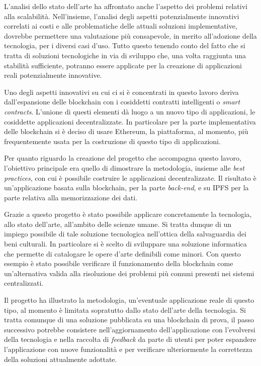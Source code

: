 L'analisi dello stato dell'arte ha affrontato anche l'aspetto dei problemi relativi alla scalabilità. Nell'insieme, l'analisi degli aspetti potenzialmente innovativi correlati ai costi e alle problematiche delle attuali soluzioni implementative, dovrebbe permettere una valutazione più consapevole, in merito all'adozione della tecnologia, per i diversi casi d'uso. Tutto questo tenendo conto del fatto che si tratta di soluzioni tecnologiche in via di sviluppo che, una volta raggiunta una stabilità sufficiente, potranno essere applicate per la creazione di applicazioni reali potenzialmente innovative. 

Uno degli aspetti innovativi su cui ci si è concentrati in questo lavoro deriva dall'espansione delle blockchain con i cosiddetti contratti intelligenti o \emph{smart contracts}. L'unione di questi elementi dà luogo a un nuovo tipo di applicazioni, le cosiddette applicazioni decentralizzate. In particolare per la parte implementativa delle blockchain si è deciso di usare Ethereum, la piattaforma, al momento, più frequentemente usata per la costruzione di questo tipo di applicazioni.

Per quanto riguardo la creazione del progetto che accompagna questo lavoro, l’obiettivo principale era quello di dimostrare la metodologia, insieme alle \emph{best practices}, con cui è possibile costruire le applicazioni decentralizzate. Il risultato è un'applicazione basata sulla blockchain, per la parte \emph{back-end}, e su IPFS per la parte relativa alla memorizzazione dei dati. 

Grazie a questo progetto è stato possibile applicare concretamente la tecnologia, allo stato dell'arte, all'ambito delle scienze umane. Si tratta dunque di un impiego possibile di tale soluzione tecnologica nell'ottica della salvaguardia dei beni culturali. In particolare si è scelto di sviluppare una soluzione informatica che permette di catalogare le opere d'arte definibili come minori. Con questo esempio è stato possibile verificare il funzionamento della blockchain come un’alternativa valida alla risoluzione dei problemi più comuni presenti nei sistemi centralizzati. 

Il progetto ha illustrato la metodologia, un'eventuale applicazione reale di questo tipo, al momento è limitata sopratutto dallo stato dell'arte della tecnologia. Si tratta comunque di una soluzione pubblicata su una blockchain di prova, il passo successivo potrebbe consistere nell'aggiornamento dell'applicazione con l'evolversi della tecnologia e nella raccolta di \emph{feedback} da parte di utenti per poter espandere l'applicazione con nuove funzionalità e per verificare ulteriormente la correttezza della soluzioni attualmente adottate.

